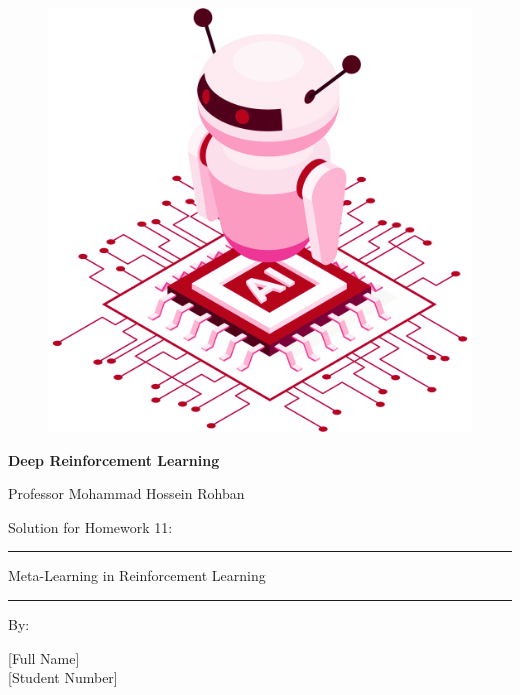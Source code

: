 \documentclass[12pt]{article}
\begin{document}
	
	\thispagestyle{plain}
	
	\begin{center}
		
		\vspace*{-1.5cm}
		\begin{figure}[!h]
			\centering
			\includegraphics[width=0.7\linewidth]{figs/cover-std.png}
		\end{figure}
		
		{
			
			{\color{DarkBlue} {\fontsize{30}{50} \textbf{
						Deep Reinforcement Learning
			}}}
			
			{\color{DarkBlue} {\Large
					Professor Mohammad Hossein Rohban
			}}
		}
		
		
		\vspace{20pt}
		
		{
			
			
			{\color{RedOrange}
				{\Large
					Solution for Homework 11:
				}\\
			}
			{\color{BrickRed}
				\rule{12cm}{0.5pt}
				
				{\Huge
					Meta-Learning in Reinforcement Learning
				}
				\rule{12cm}{0.5pt}
			}
			
			\vspace{10pt}
			
			{\color{RoyalPurple} { \small By:} } \\
			\vspace{10pt}
			
			{\color{Blue} { \LARGE [Full Name] } } \\
			\vspace{5pt}
			{\color{RoyalBlue} { \Large [Student Number] } }
			
}
\end{center}
\end{document}
